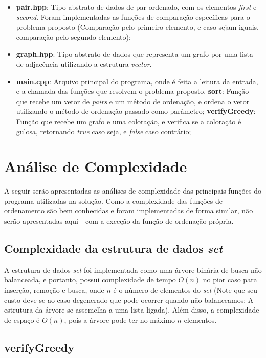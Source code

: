 \documentclass{article}
\begin{document}
\begin{itemize}
    \item \textbf{pair.hpp}: Tipo abstrato de dados de par ordenado, com os elementos \emph{first} e \emph{second}. Foram implementadas as funções de comparação específicas para o problema proposto (Comparação pelo primeiro elemento, e caso sejam iguais, comparação pelo segundo elemento);
    \item \textbf{graph.hpp}: Tipo abstrato de dados que representa um grafo por uma lista de adjacência utilizando a estrutura \emph{vector}. 
    \item \textbf{main.cpp}: Arquivo principal do programa, onde é feita a leitura da entrada, e a chamada das funções que resolvem o problema proposto.
        \subitem \textbf{sort}: Função que recebe um vetor de \emph{pairs} e um método de ordenação, e ordena o vetor utilizando o método de ordenação passado como parâmetro;
        \subitem \textbf{verifyGreedy}: Função que recebe um grafo e uma coloração, e verifica se a coloração é gulosa, retornando \emph{true} caso seja, e \emph{false} caso contrário;
    
\end{itemize}

\section{Análise de Complexidade}

A seguir serão apresentadas as análises de complexidade das principais funções do programa utilizadas na solução. Como a complexidade das funções de ordenamento são bem conhecidas e foram implementadas de forma similar, não serão apresentadas aqui - com a exceção da função de ordenação própria.

\subsection{Complexidade da estrutura de dados \emph{set}}

A estrutura de dados \emph{set} foi implementada como uma árvore binária de busca não balanceada, e portanto, possui complexidade de tempo $ O(n)$ no pior caso para inserção, remoção e busca, onde $n$ é o número de elementos do \emph{set} (Note que seu custo deve-se ao caso degenerado que pode ocorrer quando não balanceamos: A estrutura da árvore se assemelha a uma lista ligada). Além disso, a complexidade de espaço é $O(n)$, pois a árvore pode ter no máximo $n$ elementos.

\subsection{verifyGreedy}
\end{document}

